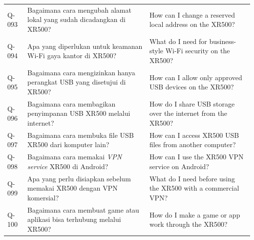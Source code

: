 \begin{longtable}{@{}>{\RaggedRight\arraybackslash}p{1.6cm}>{\RaggedRight\arraybackslash}p{5.8cm}>{\RaggedRight\arraybackslash}p{\dimexpr\textwidth-1.6cm-5.8cm-4\tabcolsep\relax}@{}}
Q-093 & Bagaimana cara mengubah alamat lokal yang sudah dicadangkan di XR500? & How can I change a reserved local address on the XR500? \\
Q-094 & Apa yang diperlukan untuk keamanan Wi-Fi gaya kantor di XR500? & What do I need for business-style Wi-Fi security on the XR500? \\
Q-095 & Bagaimana cara mengizinkan hanya perangkat USB yang disetujui di XR500? & How can I allow only approved USB devices on the XR500? \\
Q-096 & Bagaimana cara membagikan penyimpanan USB XR500 melalui internet? & How do I share USB storage over the internet from the XR500? \\
Q-097 & Bagaimana cara membuka file USB XR500 dari komputer lain? & How can I access XR500 USB files from another computer? \\
Q-098 & Bagaimana cara memakai \emph{VPN service} XR500 di Android? & How can I use the XR500 VPN service on Android? \\
Q-099 & Apa yang perlu disiapkan sebelum memakai XR500 dengan VPN komersial? & What do I need before using the XR500 with a commercial VPN? \\
Q-100 & Bagaimana cara membuat game atau aplikasi bisa terhubung melalui XR500? & How do I make a game or app work through the XR500? \\
\end{longtable}
\endgroup
